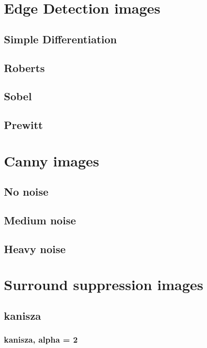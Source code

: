 \documentclass[10pt,a4paper]{article}
\begin{document}
\section{Edge Detection images}
\subsection{Simple Differentiation}



\subsection{Roberts}



\subsection{Sobel}



\subsection{Prewitt}


\section{Canny images}
\subsection{No noise}

\subsection{Medium noise}

\subsection{Heavy noise}


\section{Surround suppression images}
\subsection{kanisza}

\subsubsection{kanisza, alpha = 2}

\end{document}
